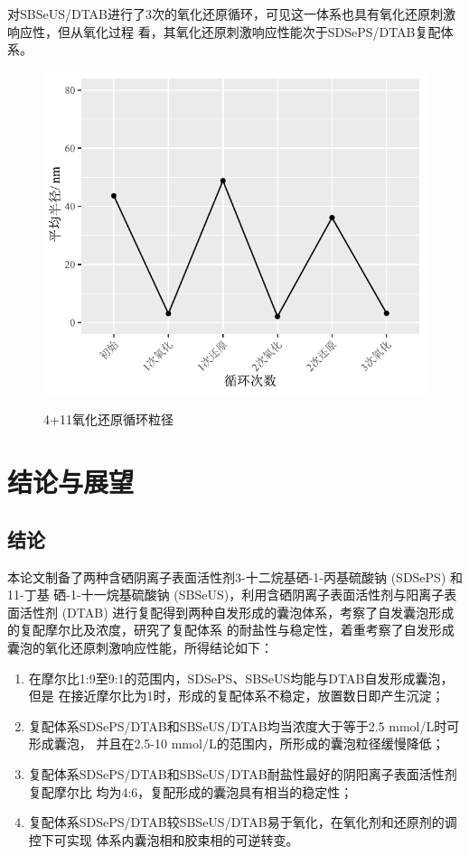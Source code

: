 \documentclass[bachelor,fandolfonts,replaceperiod]{jnuthesis}
\begin{document}
    对SBSeUS/DTAB进行了3次的氧化还原循环，可见这一体系也具有氧化还原刺激响应性，但从氧化过程
    看，其氧化还原刺激响应性能次于SDSePS/DTAB复配体系。
    \begin{figure}[htbp]
        \centering
        \includegraphics[width=.6\textwidth]{figure/SBSeUS-redox-circle}\\
        \caption{4+11氧化还原循环粒径}\label{fig:SBSeUS-redox-circle}
    \end{figure}
    
    \chapter{结论与展望}\label{chapter:concludes}
    \section{结论}
    本论文制备了两种含硒阴离子表面活性剂3-十二烷基硒-1-丙基硫酸钠 (SDSePS) 和11-丁基
    硒-1-十一烷基硫酸钠 (SBSeUS)，利用含硒阴离子表面活性剂与阳离子表面活性剂 (DTAB)
    进行复配得到两种自发形成的囊泡体系，考察了自发囊泡形成的复配摩尔比及浓度，研究了复配体系
    的耐盐性与稳定性，着重考察了自发形成囊泡的氧化还原刺激响应性能，所得结论如下：
    \begin{enumerate}
        \item 在摩尔比1:9至9:1的范围内，SDSePS、SBSeUS均能与DTAB自发形成囊泡，但是
        在接近摩尔比为1时，形成的复配体系不稳定，放置数日即产生沉淀；
        \item 复配体系SDSePS/DTAB和SBSeUS/DTAB均当浓度大于等于2.5 mmol/L时可形成囊泡，
        并且在2.5-10 mmol/L的范围内，所形成的囊泡粒径缓慢降低；
        \item 复配体系SDSePS/DTAB和SBSeUS/DTAB耐盐性最好的阴阳离子表面活性剂复配摩尔比
        均为4:6，复配形成的囊泡具有相当的稳定性；
        \item 复配体系SDSePS/DTAB较SBSeUS/DTAB易于氧化，在氧化剂和还原剂的调控下可实现
        体系内囊泡相和胶束相的可逆转变。
    \end{enumerate}
        
\end{document}
